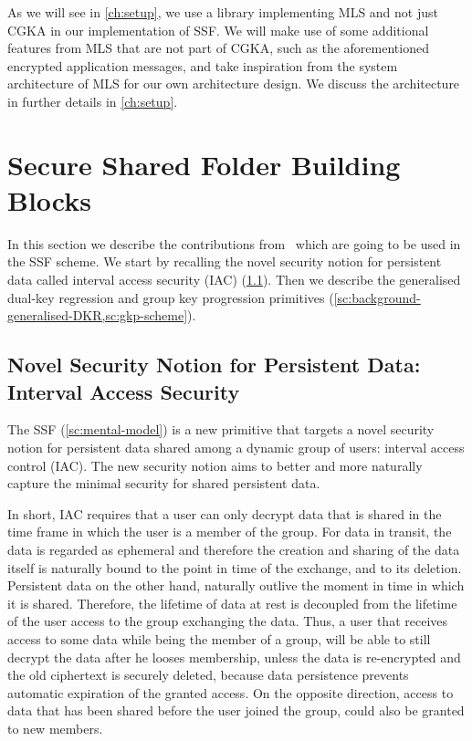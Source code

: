 As we will see in \cref{ch:setup}, we use a library implementing MLS and not just CGKA in our implementation of SSF.
We will make use of some additional features from MLS that are not part of CGKA, such as the
aforementioned encrypted application messages,
and take inspiration from the system architecture of MLS for our own architecture design.
We discuss the architecture in further details in \cref{ch:setup}.

\section{Secure Shared Folder Building Blocks}\label{sc:SSF}

In this section we describe the
contributions from~\cite{GKP}
which are going to be used
in the SSF scheme.
We start by recalling the novel security notion for persistent
data called interval access security (IAC) (\cref{sc:iac}).
Then we describe the generalised dual-key regression and group key progression primitives
(\cref{sc:background-generalised-DKR,sc:gkp-scheme}).

\subsection{Novel Security Notion for Persistent Data: Interval Access Security}\label{sc:iac}

The SSF (\cref{sc:mental-model}) is a new primitive that targets a novel security 
notion for persistent data shared among a dynamic 
group of users: interval access control (IAC).
The new security notion aims to better and more naturally
capture the minimal security for shared persistent data.

In short, IAC requires that a user can only decrypt data that
is shared in the time frame in which the user is a member
of the group. For data in transit, the data is regarded as
ephemeral and therefore the creation and sharing of the data
itself is naturally bound to the point in time of the exchange,
and to its deletion. Persistent data on the other hand, naturally
outlive the moment in time in which it is shared.
Therefore, the lifetime of data at rest is decoupled from the
lifetime of the user access to the group exchanging the data.
Thus, a user that receives access to some data while being the
member of a group, will be able to still decrypt the data
after he looses membership, unless the data is re-encrypted
and the old ciphertext is securely deleted, because data
persistence prevents automatic expiration of the granted access.
On the opposite direction, access to data that has been
shared before the user joined the group, could also be granted
to new members.

